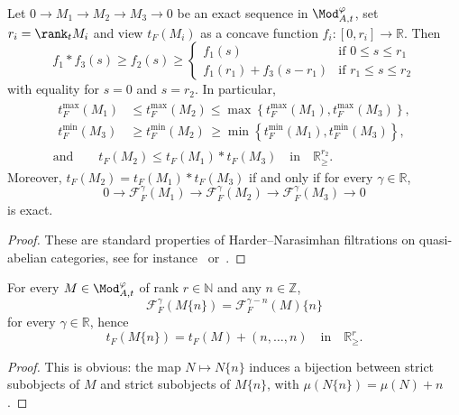 \begin{prop}\label{prop:ExactSeqInModt}
Let $0\rightarrow M_{1}\rightarrow M_{2}\rightarrow M_{3}\rightarrow0$ be an exact sequence in $\Mod_{A,t}^{\varphi}$, set $r_{i}=\rank_{t}M_{i}$ and view $t_{F}(M_{i})$ as a concave function $f_{i}:[0,r_{i}]\rightarrow\mathbb{R}$. Then
\[
f_{1}\ast f_{3}(s)\geq f_{2}(s)\geq
\begin{cases}
f_{1}(s) & \text{if }0\leq s\leq r_{1}\\
f_{1}(r_{1})+f_{3}(s-r_{1}) & \text{if }r_{1}\leq s\leq r_{2}
\end{cases}
\]
with equality for $s=0$ and $s=r_{2}$. In particular,
\begin{gather*}
\begin{aligned}
t_{F}^{\max}(M_{1}) & \leq t_{F}^{\max}(M_{2}) \leq \max\left\{ t_{F}^{\max}(M_{1}),t_{F}^{\max}(M_{3})\right\},\\
t_{F}^{\min}(M_{3}) & \geq t_{F}^{\min}(M_{2})\, \geq \min\left\{ t_{F}^{\min}(M_{1}),t_{F}^{\min}(M_{3})\right\},
\end{aligned}
\\
\text{and}\qquad t_{F}(M_{2})\leq t_{F}(M_{1})\ast t_{F}(M_{3})\quad\text{in}\quad\mathbb{R}_{\geq}^{r_{2}}.
\end{gather*}
Moreover, $t_{F}(M_{2})=t_{F}(M_{1})\ast t_{F}(M_{3})$ if and only if for every $\gamma\in\mathbb{R}$,
\[
0\rightarrow\mathcal{F}_{F}^{\gamma}(M_{1})\rightarrow\mathcal{F}_{F}^{\gamma}(M_{2})\rightarrow\mathcal{F}_{F}^{\gamma}(M_{3})\rightarrow0
\]
is exact.
\end{prop}

\begin{proof}
These are standard properties of Harder--Narasimhan filtrations on quasi-abelian categories, see for instance~\cite[Proposition~21]{Co16} or~\cite[4.4.4]{An09}.
\end{proof}

\begin{prop}\label{prop:tF(twist)onModt}
For every $M\in\Mod_{A,t}^{\varphi}$ of rank $r\in\mathbb{N}$ and any $n\in\mathbb{Z}$,
\[
\mathcal{F}_{F}^{\gamma}(M\{n\})=\mathcal{F}_{F}^{\gamma-n}(M)\{n\}
\]
for every $\gamma\in\mathbb{R}$, hence
\[
t_{F}(M\{n\})=t_{F}(M)+(n,\dots,n)\quad\text{in}\quad\mathbb{R}_{\geq}^{r}.
\]
\end{prop}

\begin{proof}
This is obvious: the map $N\mapsto N\{n\}$ induces a bijection between strict subobjects of $M$ and strict subobjects of $M\{n\}$, with $\mu(N\{n\})=\mu(N)+n$.
\end{proof}

